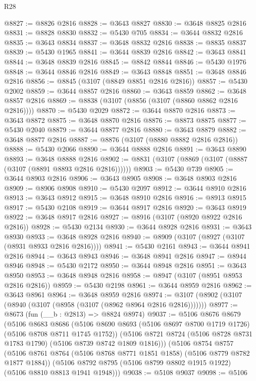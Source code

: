 \begin{lexlean}{R28}
\begin{coremodule}
@8827 := @8826 @2816
@8828 := @3643 @8827
@8830 := @3648 @8825 @2816
@8831 := @8828 @8830
@8832 := @5430 @705
@8834 := @3644 @8832 @2816
@8835 := @3643 @8834
@8837 := @3648 @8832 @2816
@8838 := @8835 @8837
@8839 := @5430 @1965
@8841 := @3644 @8839 @2816
@8842 := @3643 @8841
@8844 := @3648 @8839 @2816
@8845 := @8842 @8844
@8846 := @5430 @1976
@8848 := @3644 @8846 @2816
@8849 := @3643 @8848
@8851 := @3648 @8846 @2816
@8856 := @8845 (@3107 (@8849 @8851 @2816 @2816))
@8857 := @5430 @2002
@8859 := @3644 @8857 @2816
@8860 := @3643 @8859
@8862 := @3648 @8857 @2816
@8869 := @8838 (@3107 (@8856 (@3107 (@8860 @8862 @2816 @2816))))
@8870 := @5430 @2029
@8872 := @3644 @8870 @2816
@8873 := @3643 @8872
@8875 := @3648 @8870 @2816
@8876 := @8873 @8875
@8877 := @5430 @2040
@8879 := @3644 @8877 @2816
@8880 := @3643 @8879
@8882 := @3648 @8877 @2816
@8887 := @8876 (@3107 (@8880 @8882 @2816 @2816))
@8888 := @5430 @2066
@8890 := @3644 @8888 @2816
@8891 := @3643 @8890
@8893 := @3648 @8888 @2816
@8902 := @8831 (@3107 (@8869 (@3107 (@8887 (@3107 (@8891 @8893 @2816 @2816))))))
@8903 := @5430 @739
@8905 := @3644 @8903 @2816
@8906 := @3643 @8905
@8908 := @3648 @8903 @2816
@8909 := @8906 @8908
@8910 := @5430 @2097
@8912 := @3644 @8910 @2816
@8913 := @3643 @8912
@8915 := @3648 @8910 @2816
@8916 := @8913 @8915
@8917 := @5430 @2108
@8919 := @3644 @8917 @2816
@8920 := @3643 @8919
@8922 := @3648 @8917 @2816
@8927 := @8916 (@3107 (@8920 @8922 @2816 @2816))
@8928 := @5430 @2134
@8930 := @3644 @8928 @2816
@8931 := @3643 @8930
@8933 := @3648 @8928 @2816
@8940 := @8909 (@3107 (@8927 (@3107 (@8931 @8933 @2816 @2816))))
@8941 := @5430 @2161
@8943 := @3644 @8941 @2816
@8944 := @3643 @8943
@8946 := @3648 @8941 @2816
@8947 := @8944 @8946
@8948 := @5430 @2172
@8950 := @3644 @8948 @2816
@8951 := @3643 @8950
@8953 := @3648 @8948 @2816
@8958 := @8947 (@3107 (@8951 @8953 @2816 @2816))
@8959 := @5430 @2198
@8961 := @3644 @8959 @2816
@8962 := @3643 @8961
@8964 := @3648 @8959 @2816
@8974 := @3107 (@8902 (@3107 (@8940 (@3107 (@8958 (@3107 (@8962 @8964 @2816 @2816)))))))
@8977 := @8673 (fun (__b : @2813) => @8824 @8974)
@9037 := @5106
    @8676
    @8679
    (@5106
      @8683
      @8686
      (@5106 @8690 @8693 (@5106 @8697 @8700 @1719 @1726) (@5106 @8708 @8711 @1745 @1752))
      (@5106 @8721 @8724 (@5106 @8728 @8731 @1783 @1790) (@5106 @8739 @8742 @1809 @1816)))
    (@5106
      @8754
      @8757
      (@5106 @8761 @8764 (@5106 @8768 @8771 @1851 @1858) (@5106 @8779 @8782 @1877 @1884))
      (@5106 @8792 @8795 (@5106 @8799 @8802 @1915 @1922) (@5106 @8810 @8813 @1941 @1948)))
@9038 := @5108 @9037
@9098 := @5106

\end{coremodule}
\end{lexlean}
